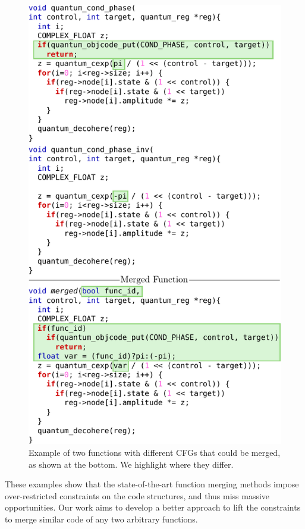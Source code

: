 \begin{figure}[t!]
  \centering
  \includegraphics[width=\linewidth]{figs/libquantum-example.pdf}
  \caption{Example of two functions with different CFGs that could be merged, as shown at the bottom.
           We highlight where they differ.}
  \label{fig:libquantum-example}
\end{figure}

These examples show that the state-of-the-art function merging methods impose over-restricted constraints on the code structures, and thus
miss massive opportunities. Our work aims to develop a better approach to lift the constraints to merge similar code of any two arbitrary
functions.
